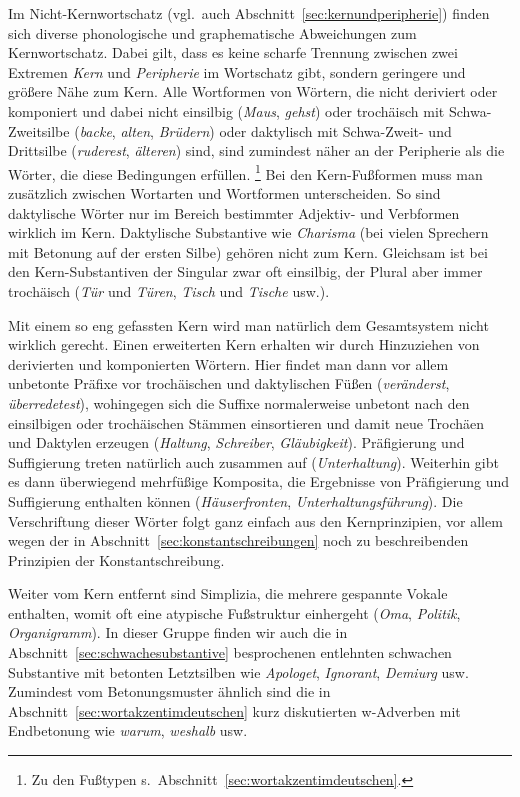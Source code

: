 Im Nicht-Kernwortschatz (vgl.\ auch Abschnitt~\ref{sec:kernundperipherie}) finden sich diverse phonologische und graphematische Abweichungen zum Kernwortschatz.
Dabei gilt, dass es keine scharfe Trennung zwischen zwei Extremen \textit{Kern} und \textit{Peripherie} im Wortschatz gibt, sondern geringere und größere Nähe zum Kern.
Alle Wortformen von Wörtern, die nicht deriviert oder komponiert und dabei nicht einsilbig (\textit{Maus}, \textit{gehst}) oder trochäisch mit Schwa-Zweitsilbe (\textit{backe}, \textit{alten}, \textit{Brüdern}) oder daktylisch mit Schwa-Zweit- und Drittsilbe (\textit{ruderest}, \textit{älteren}) sind, sind zumindest näher an der Peripherie als die Wörter, die diese Bedingungen erfüllen.%
\footnote{Zu den Fußtypen s.\ Abschnitt~\ref{sec:wortakzentimdeutschen}.}
Bei den Kern-Fußformen muss man zusätzlich zwischen Wortarten und Wortformen unterscheiden.
So sind \zB daktylische Wörter nur im Bereich bestimmter Adjektiv- und Verbformen wirklich im Kern.
Daktylische Substantive wie \textit{Charisma} \textipa{[ka.KIs.ma]} (bei vielen Sprechern mit Betonung auf der ersten Silbe) gehören nicht zum Kern.
Gleichsam ist bei den Kern-Substantiven der Singular zwar oft einsilbig, der Plural aber immer trochäisch (\textit{Tür} und \textit{Türen}, \textit{Tisch} und \textit{Tische} usw.).

Mit einem so eng gefassten Kern wird man natürlich dem Gesamtsystem nicht wirklich gerecht.
Einen erweiterten Kern erhalten wir durch Hinzuziehen von derivierten und komponierten Wörtern.
Hier findet man dann vor allem unbetonte Präfixe vor trochäischen und daktylischen Füßen (\textit{veränderst}, \textit{überredetest}), wohingegen sich die Suffixe normalerweise unbetont nach den einsilbigen oder trochäischen Stämmen einsortieren und damit neue Trochäen und Daktylen erzeugen (\textit{Haltung}, \textit{Schreiber}, \textit{Gläubigkeit}).
Präfigierung und Suffigierung treten natürlich auch zusammen auf (\textit{Unterhaltung}).
Weiterhin gibt es dann überwiegend mehrfüßige Komposita, die Ergebnisse von Präfigierung und Suffigierung enthalten können (\textit{Häuserfronten}, \textit{Unterhaltungsführung}).
Die Verschriftung dieser Wörter folgt ganz einfach aus den Kernprinzipien, vor allem wegen der in Abschnitt~\ref{sec:konstantschreibungen} noch zu beschreibenden Prinzipien der Konstantschreibung.

Weiter vom Kern entfernt sind Simplizia, die mehrere gespannte Vokale enthalten, womit oft eine atypische Fußstruktur einhergeht (\textit{Oma}, \textit{Politik}, \textit{Organigramm}).
In dieser Gruppe finden wir auch die in Abschnitt~\ref{sec:schwachesubstantive} besprochenen entlehnten schwachen Substantive mit betonten Letztsilben wie \textit{Apologet}, \textit{Ignorant}, \textit{Demiurg} usw.
Zumindest vom Betonungsmuster ähnlich sind die in Abschnitt~\ref{sec:wortakzentimdeutschen} kurz diskutierten w-Adverben mit Endbetonung wie \textit{warum}, \textit{weshalb} usw.

